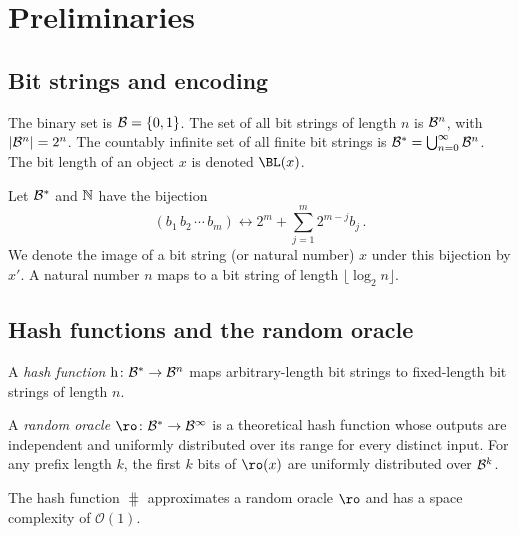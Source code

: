 \section{Preliminaries}
\label{sec:prelim}

\subsection{Bit strings and encoding}

The binary set is $\mathcal{B} = \{0,1\}$.
The set of all bit strings of length $n$ is $\mathcal{B}^{n}$, with
$\lvert\mathcal{B}^{n}\rvert = 2^n$.
The countably infinite set of all finite bit strings is
$\mathcal{B}^{*} = \bigcup_{n=0}^{\infty} \mathcal{B}^{n}$.
The bit length of an object $x$ is denoted $\BL(x)$.

\begin{definition}
\label{def:mapping}
Let $\mathcal{B}^{*}$ and $\mathbb{N}$ have the bijection
\begin{equation}
    (b_1 \, b_2 \, \cdots \, b_m) \longleftrightarrow 2^m + \sum_{j=1}^{m} 2^{m-j} b_j\,.
\end{equation}
We denote the image of a bit string (or natural number) $x$ under this
bijection by $x'$.
A natural number $n$ maps to a bit string of length $\lfloor \log_2 n \rfloor$.
\end{definition}

\subsection{Hash functions and the random oracle}

\begin{definition}
A \emph{hash function} $\hash \colon \cisb \to \cisbn{n}$ maps arbitrary-length
bit strings to fixed-length bit strings of length $n$.
\end{definition}

\begin{definition}
\label{def:randomoracle}
A \emph{random oracle} $\ro \colon \cisb \to \cisbn{\infty}$ is a theoretical
hash function whose outputs are independent and uniformly distributed over its
range for every distinct input.
For any prefix length $k$, the first $k$ bits of $\ro(x)$ are uniformly
distributed over $\mathcal{B}^{k}$.
\end{definition}

\begin{assumption}
\label{asm:ro_approx}
The hash function $\hash$ approximates a random oracle $\ro$ and has a space
complexity of $\mathcal{O}(1)$.
\end{assumption}


